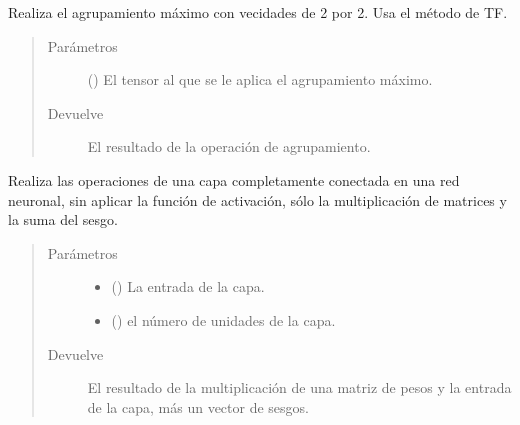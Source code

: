 
\begin{fulllineitems}
\label{\detokenize{model_desc:cnn_indoor_classifier_model.max_pool_2by2}}
Realiza el agrupamiento máximo con vecidades de 2 por 2.
Usa el método  de TF.
\begin{quote}\begin{description}
\item[{Parámetros}] \leavevmode
{} () \textendash{} El tensor al que se le aplica el agrupamiento máximo.

\item[{Devuelve}] \leavevmode
El resultado de la operación de agrupamiento.

\end{description}\end{quote}

\end{fulllineitems}


\begin{fulllineitems}
\label{\detokenize{model_desc:cnn_indoor_classifier_model.normal_full_layer}}
Realiza las operaciones de una capa completamente 
conectada en una red neuronal, sin aplicar
la función de activación, sólo la multiplicación 
de matrices y la suma del sesgo.
\begin{quote}\begin{description}
\item[{Parámetros}] \leavevmode\begin{itemize}
\item {} 
 () \textendash{} La entrada de la capa.

\item {} 
 () \textendash{} el número de unidades de la capa.

\end{itemize}

\item[{Devuelve}] \leavevmode
El resultado de la multiplicación de una matriz de pesos y la entrada de la capa, más un vector de sesgos.

\end{description}\end{quote}

\end{fulllineitems}